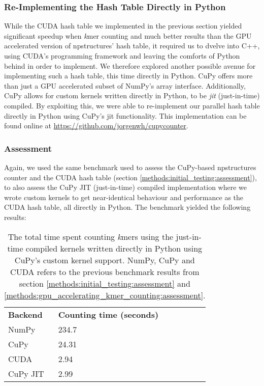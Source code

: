 \subsubsection{Re-Implementing the Hash Table Directly in Python} \label{methods:gpu_accelerating_kmer_counting_jit}
While the CUDA hash table we implemented in the previous section yielded significant speedup when \textit{k}mer counting and much better results than the GPU accelerated version of npstructures' hash table, it required us to dvelve into C++, using CUDA's programming framework and leaving the comforts of Python behind in order to implement.
We therefore explored another possible avenue for implementing such a hash table, this time directly in Python.
CuPy offers more than just a GPU accelerated subset of NumPy's array interface.
Additionally, CuPy allows for custom kernels written directly in Python, to be \textit{jit} (just-in-time) compiled.
By exploiting this, we were able to re-implement our parallel hash table directly in Python using CuPy's jit functionality.
This implementation can be found online at \url{https://github.com/jorgenwh/cupycounter}.

\subsubsection{Assessment}
Again, we used the same benchmark used to assess the CuPy-based npstructures counter and the CUDA hash table (section \ref{methods:initial_testing:assessment}), to also assess the CuPy JIT (just-in-time) compiled implementation where we wrote custom kernels to get near-identical behaviour and performance as the CUDA hash table, all directly in Python.
The benchmark yielded the following results:
\begin{table}[H]
\begin{center}
\begin{tabular}{lllll}
\multicolumn{1}{l|}{\textbf{Backend}} & \multicolumn{1}{l}{\textbf{Counting time (seconds)}} &  \\ \cline{1-2}
\multicolumn{1}{l|}{NumPy} & \multicolumn{1}{l}{234.7} &  \\
\multicolumn{1}{l|}{CuPy} & \multicolumn{1}{l}{24.31} &  \\
\multicolumn{1}{l|}{CUDA} & \multicolumn{1}{l}{2.94} &  \\
\multicolumn{1}{l|}{CuPy JIT} & \multicolumn{1}{l}{2.99} &  \\
\end{tabular}
\end{center}
\caption{
  The total time spent counting \textit{k}mers using the just-in-time compiled kernels written directly in Python using CuPy's custom kernel support.
  NumPy, CuPy and CUDA refers to the previous benchmark results from section \ref{methods:initial_testing:assessment} and \ref{methods:gpu_accelerating_kmer_counting:assessment}.
}
\label{methods:gpu_accelerating_kmer_counting_jit:tables:benchmark}
\end{table}

